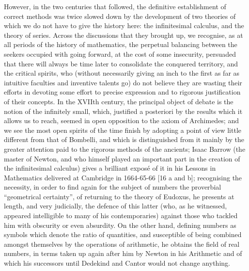 However, in the two centuries that followed, the definitive establishment of correct methods was twice slowed down by the development of two theories of which we do not have to give the history here: the infinitesimal calculus, and the theory of series. Across the discussions that they brought up, we recognise, as at all periods of the history of mathematics, the perpetual balancing between the seekers occupied with going forward, at the cost of some insecurity, persuaded that there will always be time later to consolidate the conquered territory, and the critical spirits, who (without necessarily giving an inch to the first as far as intuitive faculties and inventive talents go) do not believe they are wasting their efforts in devoting some effort to precise expression and to rigorous justification of their concepts. In the XVIIth century, the principal object of debate is the notion of the infinitely small, which, justified a posteriori by the results which it allows us to reach, seemed in open opposition to the axiom of Archimedes; and we see the most open spirits of the time finish by adopting a point of view little different from that of Bombelli, and which is distinguished from it mainly by the greater attention paid to the rigorous methods of the ancients; Isaac Barrow (the master of Newton, and who himself played an important part in the creation of the infinitesimal calculus) gives a brilliant exposé of it in his Lessons in Mathematics delivered at Cambridge in 1664-65-66 {[}16 a and b{]}; recognising the necessity, in order to find again for the subject of numbers the proverbial ``geometrical certainty'', of returning to the theory of Eudoxus, he presents at length, and very judicially, the defence of this latter (who, as he witnessed, appeared intelligible to many of his contemporaries) against those who tackled him with obscurity or even absurdity. On the other hand, defining numbers as symbols which denote the ratio of quantities, and susceptible of being combined amongst themselves by the operations of arithmetic, he obtains the field of real numbers, in terms taken up again after him by Newton in his Arithmetic and of which his successors until Dedekind and Cantor would not change anything.

